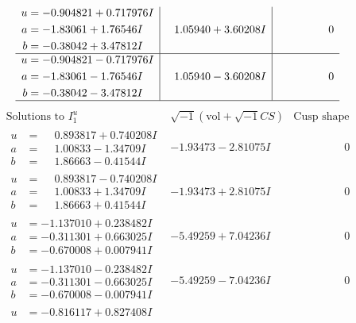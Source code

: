 \documentclass[1p]{elsarticle_modified}
\theoremstyle{definition}
\newcommand{\I}{\sqrt{-1}}
\begin{document}
$$\begin{array}{c|c|c}
\begin{aligned}
u &= -0.904821 + 0.717976 I \\
a &= -1.83061 + 1.76546 I \\
b &= -0.38042 + 3.47812 I\end{aligned}
 & \phantom{-}1.05940 + 3.60208 I & \phantom{-0.000000 } 0 \\ \hline\begin{aligned}
u &= -0.904821 - 0.717976 I \\
a &= -1.83061 - 1.76546 I \\
b &= -0.38042 - 3.47812 I\end{aligned}
 & \phantom{-}1.05940 - 3.60208 I & \phantom{-0.000000 } 0\\
 \hline 
 \end{array}$$\newpage$$\begin{array}{c|c|c}  
\text{Solutions to }I^u_{1}& \I (\text{vol} + \sqrt{-1}CS) & \text{Cusp shape}\\
 \hline 
\begin{aligned}
u &= \phantom{-}0.893817 + 0.740208 I \\
a &= \phantom{-}1.00833 - 1.34709 I \\
b &= \phantom{-}1.86663 - 0.41544 I\end{aligned}
 & -1.93473 - 2.81075 I & \phantom{-0.000000 } 0 \\ \hline\begin{aligned}
u &= \phantom{-}0.893817 - 0.740208 I \\
a &= \phantom{-}1.00833 + 1.34709 I \\
b &= \phantom{-}1.86663 + 0.41544 I\end{aligned}
 & -1.93473 + 2.81075 I & \phantom{-0.000000 } 0 \\ \hline\begin{aligned}
u &= -1.137010 + 0.238482 I \\
a &= -0.311301 + 0.663025 I \\
b &= -0.670008 + 0.007941 I\end{aligned}
 & -5.49259 + 7.04236 I & \phantom{-0.000000 } 0 \\ \hline\begin{aligned}
u &= -1.137010 - 0.238482 I \\
a &= -0.311301 - 0.663025 I \\
b &= -0.670008 - 0.007941 I\end{aligned}
 & -5.49259 - 7.04236 I & \phantom{-0.000000 } 0 \\ \hline\begin{aligned}
u &= -0.816117 + 0.827408 I \\

\end{aligned}
\end{array}$$
\end{document}
